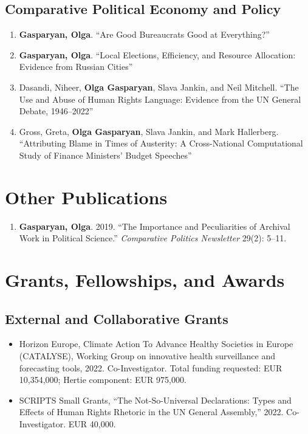 \documentclass[10pt]{article}
\newcommand{\me}{\textbf{Gasparyan, Olga}}
\begin{document}
\subsection{Comparative Political Economy and Policy}
\begin{enumerate}
    \item \me. ``Are Good Bureaucrats Good at Everything?''

    \item \me. ``Local Elections, Efficiency, and Resource Allocation: Evidence from Russian Cities''

    \item Dasandi, Niheer, \textbf{Olga Gasparyan}, Slava Jankin, and Neil Mitchell. ``The Use and Abuse of Human Rights Language: Evidence from the UN General Debate, 1946--2022''

    \item Gross, Greta, \textbf{Olga Gasparyan}, Slava Jankin, and Mark Hallerberg. ``Attributing Blame in Times of Austerity: A Cross-National Computational Study of Finance Ministers' Budget Speeches''
\end{enumerate}

\section{Other Publications}
\begin{enumerate}
    \item \me. 2019. ``The Importance and Peculiarities of Archival Work in Political Science.'' \textit{Comparative Politics Newsletter} 29(2): 5--11.
\end{enumerate}

\section{Grants, Fellowships, and Awards}

\subsection{External and Collaborative Grants}
\begin{itemize}
    \item Horizon Europe, Climate Action To Advance Healthy Societies in Europe (CATALYSE), Working Group on innovative health surveillance and forecasting tools, 2022. Co-Investigator. Total funding requested: EUR 10,354,000; Hertie component: EUR 975,000.
    \item SCRIPTS Small Grants, ``The Not-So-Universal Declarations: Types and Effects of Human Rights Rhetoric in the UN General Assembly,'' 2022. Co-Investigator. EUR 40,000.
\end{itemize}
\end{document}
